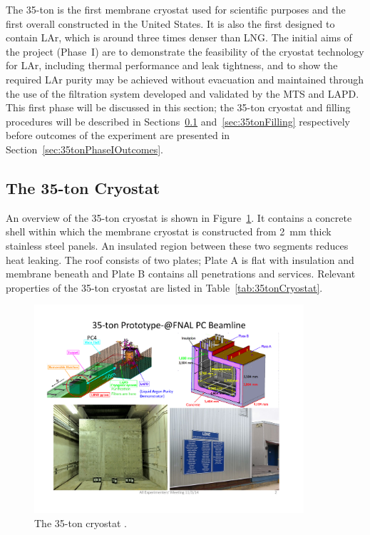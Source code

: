 The 35-ton is the first membrane cryostat used for scientific purposes and the first overall constructed in the United States.  It is also the first designed to contain LAr, which is around three times denser than LNG.  The initial aims of the project (Phase~I) are to demonstrate the feasibility of the cryostat technology for LAr, including thermal performance and leak tightness, and to show the required LAr purity may be achieved without evacuation and maintained through the use of the filtration system developed and validated by the MTS and LAPD.  This first phase will be discussed in this section; the 35-ton cryostat and filling procedures will be described in Sections~\ref{sec:35tonCryostat} and~\ref{sec:35tonFilling} respectively before outcomes of the experiment are presented in Section~\ref{sec:35tonPhaseIOutcomes}.

\subsection{The 35-ton Cryostat}\label{sec:35tonCryostat}

An overview of the 35-ton cryostat is shown in Figure~\ref{fig:35tonCryostat}.  It contains a concrete shell within which the membrane cryostat is constructed from 2~mm thick stainless steel panels.  An insulated region between these two segments reduces heat leaking.  The roof consists of two plates; Plate A is flat with insulation and membrane beneath and Plate B contains all penetrations and services.  Relevant properties of the 35-ton cryostat are listed in Table~\ref{tab:35tonCryostat}.

\begin{figure}
  \centering
  \includegraphics[width=10cm]{35tonCryostat.pdf}
  \caption[The 35-ton cryostat.]{The 35-ton cryostat \cite{35tonPhaseI2015}.}
  \label{fig:35tonCryostat}
\end{figure}

